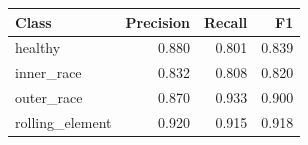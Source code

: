 \begin{tabular}{lrrr}
\hline
Class & Precision & Recall & F1 \\
\hline
healthy & 0.880 & 0.801 & 0.839 \\
inner\_race & 0.832 & 0.808 & 0.820 \\
outer\_race & 0.870 & 0.933 & 0.900 \\
rolling\_element & 0.920 & 0.915 & 0.918 \\
\hline
\end{tabular}
